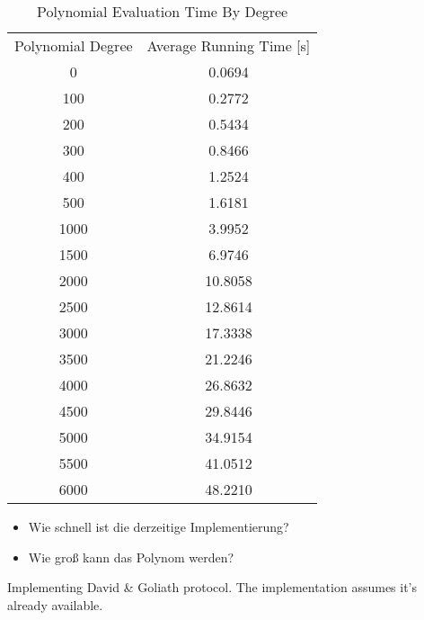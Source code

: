 \begin{table}[ht]
  \centering
  \begin{tabular}{|c|c|}
    Polynomial Degree & Average Running Time [s] \\
    0 & 0.0694 \\
    100 & 0.2772 \\
    200 & 0.5434 \\
    300 & 0.8466 \\
    400 & 1.2524 \\
    500 & 1.6181 \\
    1000 &  3.9952 \\
    1500 &  6.9746 \\
    2000 & 10.8058 \\
    2500 & 12.8614 \\
    3000 & 17.3338 \\
    3500 & 21.2246 \\
    4000 & 26.8632 \\
    4500 & 29.8446 \\
    5000 & 34.9154 \\
    5500 & 41.0512 \\
    6000 & 48.2210 \\
  \end{tabular}
  \caption{Polynomial Evaluation Time By Degree}
  \label{tab:poly-deg-t}
\end{table}

\begin{JWtodoBox}

\begin{itemize}

\item Wie schnell ist die derzeitige Implementierung?

\item Wie groß kann das Polynom werden?

\end{itemize}

\end{JWtodoBox}



Implementing David \& Goliath protocol. The implementation assumes it's already
available.
